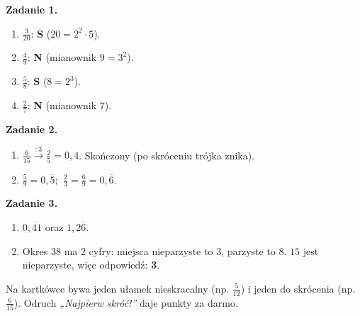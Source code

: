 \documentclass[11pt,a4paper]{article}
\begin{document}

\vspace{0.6em}
\textbf{Zadanie 1.}
\begin{enumerate}[label=\alph*), leftmargin=*, itemsep=4pt]
  \item $\frac{3}{20}$: \textbf{S} ($20=2^2\cdot 5$).
  \item $\frac{4}{9}$: \textbf{N} (mianownik $9=3^2$).
  \item $\frac{5}{8}$: \textbf{S} ($8=2^3$).
  \item $\frac{2}{7}$: \textbf{N} (mianownik $7$).
\end{enumerate}

\textbf{Zadanie 2.}
\begin{enumerate}[label=\alph*), leftmargin=*, itemsep=4pt]
  \item $\frac{6}{15}\xrightarrow{:3}\frac{2}{5}=0{,}4$. Skończony (po skróceniu trójka znika).
  \item $\frac{5}{9}=0{,}\overline{5}$; $\ \frac{2}{3}=\frac{6}{9}=0{,}\overline{6}$.
\end{enumerate}

\textbf{Zadanie 3.}
\begin{enumerate}[label=\alph*), leftmargin=*, itemsep=4pt]
  \item $0{,}\overline{41}$ oraz $1{,}2\overline{6}$.
  \item Okres $38$ ma 2 cyfry: miejsca nieparzyste to $3$, parzyste to $8$. $15$ jest nieparzyste, więc odpowiedź: \textbf{3}.
\end{enumerate}

\vspace{0.6em}
\begin{tcolorbox}[colback=white, colframe=okres, boxrule=0.6pt, arc=2pt, title=Wskazówka dla Pawła]
Na kartkówce bywa jeden ułamek nieskracalny (np. $\frac{5}{12}$) i jeden do skrócenia (np. $\frac{6}{15}$). Odruch \emph{„Najpierw skróć!”} daje punkty za darmo.
\end{tcolorbox}
\end{document}
